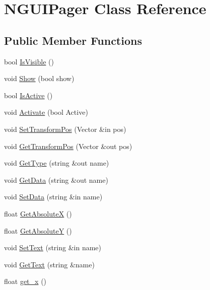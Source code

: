 \hypertarget{class_n_g_u_i_pager}{}\section{N\+G\+U\+I\+Pager Class Reference}
\label{class_n_g_u_i_pager}
\subsection*{Public Member Functions}
\begin{DoxyCompactItemize}
\item 
bool \hyperlink{class_n_g_u_i_pager_a38d632857c51250b720ce5f171191aa4}{Is\+Visible} ()
\item 
void \hyperlink{class_n_g_u_i_pager_a1eb1701225878ba653aaa4b336760c3d}{Show} (bool show)
\item 
bool \hyperlink{class_n_g_u_i_pager_ab725f94a842b6874d0f14ed8026ec2d4}{Is\+Active} ()
\item 
void \hyperlink{class_n_g_u_i_pager_a23f135091e22edda1a3d8188766b9f7e}{Activate} (bool Active)
\item 
void \hyperlink{class_n_g_u_i_pager_a3b73a40998208d9931cb185659a7c90c}{Set\+Transform\+Pos} (Vector \&in pos)
\item 
void \hyperlink{class_n_g_u_i_pager_ae433a93241f12cd90a325399d577adf2}{Get\+Transform\+Pos} (Vector \&out pos)
\item 
void \hyperlink{class_n_g_u_i_pager_a211de9f5d76da42aa29c59740c180014}{Get\+Type} (string \&out name)
\item 
void \hyperlink{class_n_g_u_i_pager_ab9a35c58ac41c6a129843338c661f8a5}{Get\+Data} (string \&out name)
\item 
void \hyperlink{class_n_g_u_i_pager_a2a82a99ec522abb9b9e2efb60672a14e}{Set\+Data} (string \&in name)
\item 
float \hyperlink{class_n_g_u_i_pager_a1924a3bd97dc92dda3925f5d82bc90c8}{Get\+AbsoluteX} ()
\item 
float \hyperlink{class_n_g_u_i_pager_aa6310a1aca1df60f6099d73803d15fd4}{Get\+AbsoluteY} ()
\item 
void \hyperlink{class_n_g_u_i_pager_aa6d94c2d38560a9babc5a07cf0c278a3}{Set\+Text} (string \&in name)
\item 
void \hyperlink{class_n_g_u_i_pager_ae062a9a6a38f500d6b2178141d4db2fd}{Get\+Text} (string \&name)
\item 
float \hyperlink{class_n_g_u_i_pager_aac1ba461eebaa98f3a795b5fb7ff4d6b}{get\+\_\+x} ()
\item 

\end{DoxyCompactItemize}
